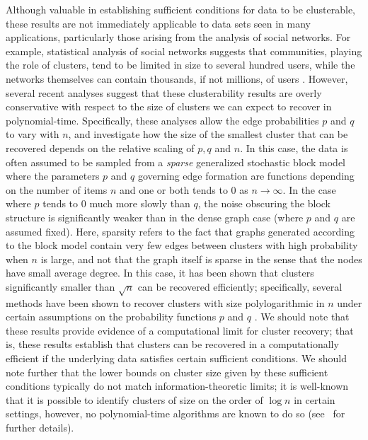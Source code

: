 \documentclass[twoside,11pt]{article}
\newcommand{\0}{\bs{0}}
\newcommand{\ra}{\rightarrow}
\begin{document}
Although valuable in establishing sufficient conditions for data to be clusterable, these results are not immediately
applicable to data sets seen in many applications, particularly those arising from the analysis of social networks.
For example, statistical analysis of social networks suggests that communities, playing the role of clusters,
tend to be limited in size to several hundred users, while the networks themselves can contain thousands, if not millions,
of users \citep{leskovec2008statistical, leskovec2009community}.
However, several recent analyses \citep{chen2014clustering,chen2014statistical, guedon2015community,jalali2015relative, rohe2012highest} suggest that these clusterability results are overly
conservative with respect to the size of clusters we can expect to recover in polynomial-time.
Specifically, these analyses allow the edge probabilities $p$ and
$q$ to vary with $n$, and investigate how the size of the smallest cluster
that can be recovered depends on the relative scaling of $p,q$ and $n$.
In this case, the data is often assumed to be sampled from a \emph{sparse} generalized stochastic block model where the parameters
\(p\) and \(q\) governing edge formation are functions depending on the number of items \(n\) and one
or both tends to \(0\) as \(n \ra \infty\). In the case where \(p \) tends to \(0\) much more slowly than \(q\), the noise
obscuring the block structure is significantly weaker than in the dense graph case (where \(p\) and \(q\) are assumed fixed).
Here, sparsity refers to the fact that graphs
generated according to the block model contain very few edges
between
clusters with high probability when $n$ is large,
and not that the graph itself is sparse in the sense that the nodes
have small average degree.
In this %
case, it has been shown that clusters significantly smaller than
\(\sqrt{n}\) can be recovered efficiently;
specifically, several methods have been shown to recover clusters with size polylogarithmic in \(n\)
under certain assumptions on the probability functions \(p\) and \(q\)  \citep[see][]{chen2014clustering,chen2014statistical, guedon2015community,rohe2012highest}.
We should note that these results provide evidence of a computational limit for cluster recovery; that is, these results establish that clusters can be recovered in a computationally efficient if the underlying data satisfies certain sufficient conditions. We should note further that the lower bounds on cluster size given by these sufficient conditions typically do not match information-theoretic limits; it is well-known that it is possible to identify clusters of size on the order of $\log n$ in certain settings, however, no polynomial-time algorithms are known to do so (see~\cite{chen2014statistical, hajek2015achieving} for further details).
\end{document}

